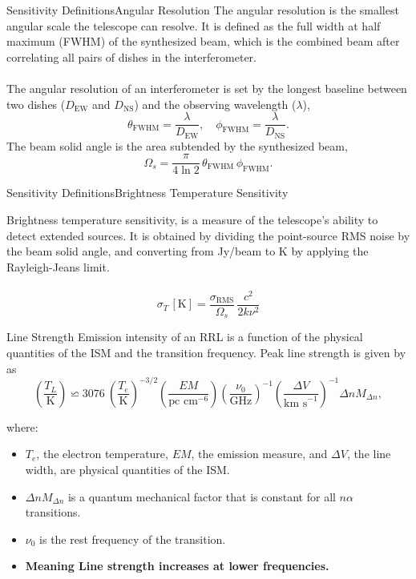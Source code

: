 \documentclass[aspectratio=169,t]{beamer}
\begin{document}
\begin{frame}{Sensitivity Definitions}{Angular Resolution}
  The angular resolution is the smallest angular scale the telescope can resolve. It is defined as the full width at half maximum (FWHM) of the synthesized beam, which is the combined beam after correlating all pairs of dishes in the interferometer.\\
  ~\\
  The angular resolution of an interferometer is set by the longest baseline between two dishes ($D_{\mathrm{EW}}$ and $D_{\mathrm{NS}}$) and the observing wavelength ($\lambda$),
  \[
  \theta_{\mathrm{FWHM}} = \frac{\lambda}{D_{\mathrm{EW}}}, \quad \phi_{\mathrm{FWHM}} = \frac{\lambda}{D_{\mathrm{NS}}}.
  \]
  The beam solid angle is the area subtended by the synthesized beam,
  \[
  \Omega_s = \frac{\pi}{4\ln 2}\,\theta_{\mathrm{FWHM}}\,\phi_{\mathrm{FWHM}}.
  \]
\end{frame}


\begin{frame}{Sensitivity Definitions}{Brightness Temperature Sensitivity}

  Brightness temperature sensitivity, is a measure of the telescope's ability to detect extended sources. It is obtained by dividing the point-source RMS noise by the beam solid angle, and converting from Jy/beam to K by applying the Rayleigh-Jeans limit.\\
  ~\\
  \[
  \sigma_T\,[\mathrm{K}] = \frac{\sigma_{\mathrm{RMS}}}{\Omega_s}\,
\frac{c^2}{2k\nu^2}
  \]
\end{frame}

\begin{frame}{Line Strength}{}
  Emission intensity of an RRL is a function of the physical quantities of the ISM and the transition frequency. Peak line strength is given by \citet{andersonGBTDiffuseIonized2021} as
  \begin{equation*}
    \left( \frac{T_L}{\text{K}} \right) \backsimeq 3076~\left(\frac{T_e}{\text{K}}\right)^{-3/2}\left(\frac{EM}{\text{pc cm}^{-6}}\right) \left(\frac{\nu_0}{\text{GHz}}\right)^{-1} \left(\frac{\Delta V}{\text{km s}^{-1}} \right)^{-1} \Delta n M_{\Delta n},
    \label{eq:line_intensity}
  \end{equation*}

where:
\begin{itemize} 
  \item $T_e$, the electron temperature, $EM$, the emission measure, and $\Delta V$, the line width, are physical quantities of the ISM. 
  \item $\Delta n M_{\Delta n}$ is a quantum mechanical factor that is constant for all $n\alpha$ transitions. 
  \item $\nu_0$ is the rest frequency of the transition. \\
  \item \textbf{Meaning Line strength increases at lower frequencies.}
\end{itemize}
\end{frame}
\end{document}
